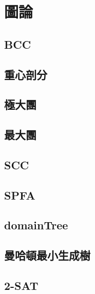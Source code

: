 \documentclass[a4paper,10pt,twocolumn,oneside]{article}
\begin{document}
\section{圖論}
\subsection{BCC}

\subsection{重心剖分}

%
%
\subsection{極大團}

\subsection{最大團}

\subsection{SCC}

\subsection{SPFA}

\subsection{domainTree} 

\subsection{曼哈頓最小生成樹}


\subsection{2-SAT}

\end{document}
